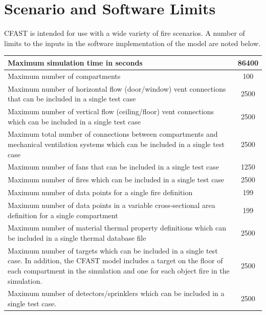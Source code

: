 
\chapter{Scenario and Software Limits}

CFAST is intended for use with a wide variety of fire scenarios.  A number of limits to the inputs in the software implementation of the model are noted below.


\begin{center}
\begin{tabular}{|p{15cm}|c|}
\hline
Maximum simulation time in seconds & 86400 \\ \hline
Maximum number of compartments & 100 \\ \hline
Maximum number of horizontal flow (door/window) vent connections that can be included in a single test case & 2500 \\ \hline
Maximum number of vertical flow (ceiling/floor) vent connections which can be included in a single test case & 2500 \\ \hline
Maximum total number of connections between compartments and mechanical ventilation systems which can be included in a single test case & 2500 \\ \hline
Maximum number of fans that can be included in a single test case  & 1250 \\ \hline

Maximum number of fires which can be included in a single test case & 2500 \\ \hline
Maximum number of data points for a single  fire definition & 199 \\ \hline
Maximum number of data points in a variable cross-sectional area definition for a single compartment & 199 \\ \hline
Maximum number of material thermal property definitions which can be included in a single thermal database file & 2500 \\ \hline

Maximum number of targets which can be included in a single test case. In addition, the CFAST model includes a target on the floor of each compartment in the simulation and one for each object fire in the simulation. & 2500 \\ \hline
Maximum number of detectors/sprinklers which can be included in a single test case. & 2500 \\ \hline

\hline
\end{tabular}
\end{center} 

\clearpage
